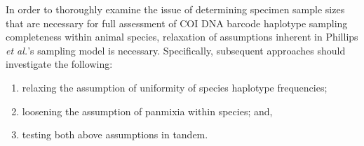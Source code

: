 \vspace{5mm}

In order to thoroughly examine the issue of determining specimen sample sizes that are necessary for full assessment of COI DNA barcode haplotype sampling completeness within animal species, relaxation of assumptions inherent in Phillips \textit{et al.}'s \cite{phillips2015exploration} sampling model is necessary. Specifically, subsequent approaches should investigate the following:

\begin{enumerate}

\item relaxing the assumption of uniformity of species haplotype frequencies;

\vspace{1mm}

\item loosening the assumption of panmixia within species; and,

\vspace{1mm}

\item testing both above assumptions in tandem.

\end{enumerate}

